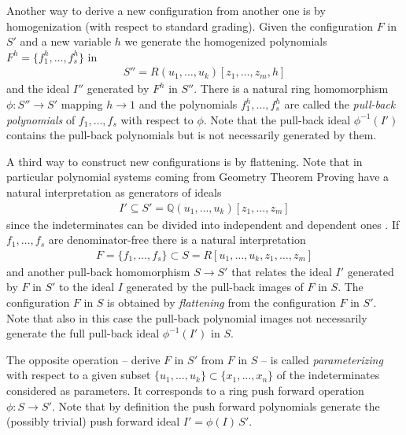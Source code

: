 \documentclass[a4paper,11pt]{article}
\begin{document}
\begin{multicols}{2}
Another way to derive a new configuration from another one is by
homogenization (with respect to standard grading). Given the configuration $F$
in $S'$ and a new variable $h$ we generate the homogenized polynomials
$F^h=\{f_1^h,\dots,f_s^h\}$ in
\begin{gather*}
  S''=R(u_1,\dots,u_k)[z_1,\dots,z_m,h]
\end{gather*}
and the ideal $I''$ generated by $F^h$ in $S''$. There is a natural ring
homomorphism $\phi:S''\rightarrow S'$ mapping $h\to 1$ and the polynomials
$f_1^h,\dots,f_s^h$ are called the \emph{pull-back polynomials} of
$f_1,\dots,f_s$ with respect to $\phi$.  Note that the pull-back ideal
$\phi^{-1}(I')$ contains the pull-back polynomials but is not necessarily
generated by them.

A third way to construct new configurations is by flattening. Note that in
particular polynomial systems coming from Geometry Theorem Proving have a
natural interpretation as generators of ideals 
\begin{gather*}
  I'\subseteq S'=\mathbb{Q}(u_1,\dots,u_k)[z_1,\dots,z_m]
\end{gather*}
since the indeterminates can be divided into independent and dependent ones
\cite{geoskript}. If $f_1,\dots,f_s$ are denominator-free there is a natural
interpretation
\begin{gather*}
  F=\{f_1,\dots,f_s\}\subset S=R[u_1,\dots,u_k,z_1,\dots,z_m]
\end{gather*}
and another pull-back homomorphism $S\rightarrow S'$ that relates the ideal
$I'$ generated by $F$ in $S'$ to the ideal $I$ generated by the pull-back
images of $F$ in $S$.  The configuration $F$ in $S$ is obtained by
\emph{flattening} from the configuration $F$ in $S'$. Note that also in this
case the pull-back polynomial images not necessarily generate the full
pull-back ideal $\phi^{-1}(I')$ in $S$.

The opposite operation -- derive $F$ in $S'$ from $F$ in $S$ -- is called
\emph{parameterizing} with respect to a given subset $\{u_1,\dots,u_k\}\subset
\{x_1,\dots,x_n\}$ of the indeterminates considered as parameters.  It
corresponds to a ring push forward operation $\phi:S\rightarrow S'$. Note that
by definition the push forward polynomials generate the (possibly trivial)
push forward ideal $I'=\phi(I)\,S'$. 


\end{multicols}
\end{document}
